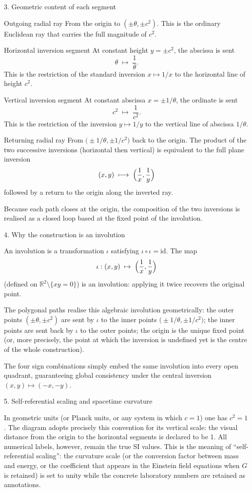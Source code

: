 3. Geometric content of each segment

Outgoing radial ray  
   From the origin to \((\pm\theta,\pm c^{2})\).  
   This is the ordinary Euclidean ray that carries the full magnitude of \(c^{2}\).

Horizontal inversion segment  
   At constant height \(y=\pm c^{2}\), the abscissa is sent  
   \[
   \theta\;\longmapsto\;\frac1\theta.
   \]
   This is the restriction of the standard inversion \(x\mapsto 1/x\) to the horizontal line of height \(c^{2}\).

Vertical inversion segment  
   At constant abscissa \(x=\pm 1/\theta\), the ordinate is sent  
   \[
   c^{2}\;\longmapsto\;\frac1{c^{2}}.
   \]
   This is the restriction of the inversion \(y\mapsto 1/y\) to the vertical line of abscissa \(1/\theta\).

Returning radial ray  
   From \(\bigl(\pm 1/\theta,\pm 1/c^{2}\bigr)\) back to the origin.  
   The product of the two successive inversions (horizontal then vertical) is equivalent to the full plane inversion
   \[
   (x,y)\;\longmapsto\;\Bigl(\frac1x,\frac1y\Bigr)
   \]
   followed by a return to the origin along the inverted ray.

Because each path closes at the origin, the composition of the two inversions is realised as a closed loop based at the fixed point of the involution.

4. Why the construction is an involution

An involution is a transformation \(\iota\) satisfying \(\iota\circ\iota=\mathrm{id}\).  
The map
\[
\iota:(x,y)\;\mapsto\;\Bigl(\frac1x,\frac1y\Bigr)
\]
(defined on \(\mathbb{R}^{2}\setminus\{xy=0\}\)) is an involution: applying it twice recovers the original point.  

The polygonal paths realise this algebraic involution geometrically:
the outer points \((\pm\theta,\pm c^{2})\) are sent by \(\iota\) to the inner points \(\bigl(\pm 1/\theta,\pm 1/c^{2}\bigr)\);
the inner points are sent back by \(\iota\) to the outer points;
the origin is the unique fixed point (or, more precisely, the point at which the inversion is undefined yet is the centre of the whole construction).

The four sign combinations simply embed the same involution into every open quadrant, guaranteeing global consistency under the central inversion \((x,y)\mapsto(-x,-y)\).

5. Self-referential scaling and spacetime curvature

In geometric units (or Planck units, or any system in which \(c=1\)) one has \(c^{2}=1\).  
The diagram adopts precisely this convention for its vertical scale: the visual distance from the origin to the horizontal segments is declared to be 1.  
All numerical labels, however, remain the true SI values.  
This is the meaning of “self-referential scaling”: the curvature scale (or the conversion factor between mass and energy, or the coefficient that appears in the Einstein field equations when \(G\) is retained) is set to unity while the concrete laboratory numbers are retained as annotations.

